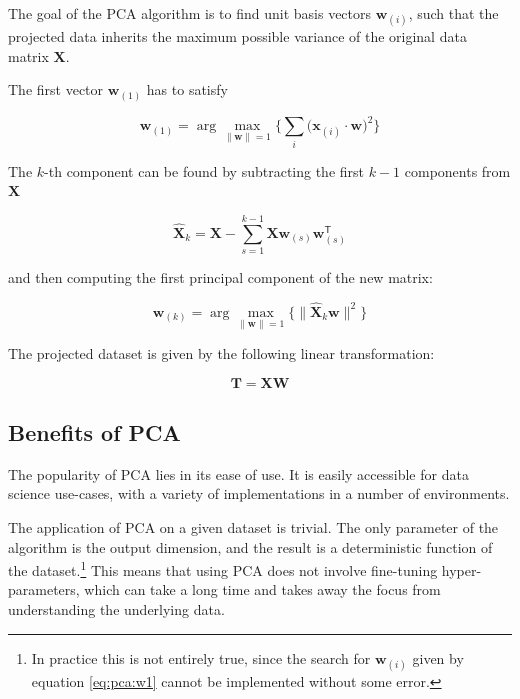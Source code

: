 The goal of the PCA algorithm is to find unit basis vectors $\mathbf{w}_{(i)}$, such that the projected data inherits the maximum possible variance of the original data matrix $\mathbf{X}$.

The first vector $\mathbf{w}_{(1)}$ has to satisfy

\begin{equation}
	\mathbf{w}_{(1)} = \arg\max_{\lVert \mathbf{w} \rVert = 1}{ \Bigg\{ \sum_i{ \big(\mathbf{x}_{(i)} \cdot \mathbf{w} \big)^2 } \Bigg\} }
	\label{eq:pca:w1}
\end{equation}

The $k$-th component can be found by subtracting the first $k - 1$ components from $\mathbf{X}$

\begin{equation}
	\mathbf{\hat{X}}_{k}=\mathbf{X}-\sum_{s=1}^{k-1}\mathbf{X}\mathbf{w}_{(s)}\mathbf{w}_{(s)}^{\mathsf{T}}
	\label{eq:pca_xhat}
\end{equation}

and then computing the first principal component of the new matrix:

\begin{equation}
	\mathbf{w}_{(k)}=\arg\max_{\lVert \mathbf{w} \rVert = 1}{\Bigg\{ \lVert \mathbf{\hat {X}}_{k}\mathbf{w} \rVert ^2 \Bigg\} }
	\label{eq:pca:wk}
\end{equation}

The projected dataset is given by the following linear transformation:

\begin{equation}
	\mathbf{T} = \mathbf{XW}
	\label{eq:pca:t}
\end{equation}

\subsection{Benefits of PCA}\label{subsec:benefits-of-pca}

The popularity of PCA lies in its ease of use. It is easily accessible for data science use-cases, with a variety of implementations in a number of environments.

The application of PCA on a given dataset is trivial. The only parameter of the algorithm is the output dimension, and the result is a deterministic function of the dataset.\footnote{In practice this is not entirely true, since the search for $\mathbf{w}_{(i)}$ given by equation \eqref{eq:pca:w1} cannot be implemented without some error.} This means that using PCA does not involve fine-tuning hyper-parameters, which can take a long time and takes away the focus from understanding the underlying data.

